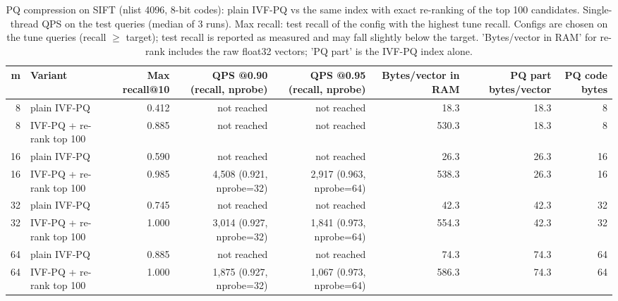 \begin{table}[t]
\centering
\small
\begin{adjustbox}{max width=\linewidth}
\begin{tabular}{rlrrrrrr}
\toprule
m & Variant & Max recall@10 & QPS @0.90 (recall, nprobe) & QPS @0.95 (recall, nprobe) & Bytes/vector in RAM & PQ part bytes/vector & PQ code bytes \\
\midrule
8 & plain IVF-PQ & 0.412 & not reached & not reached & 18.3 & 18.3 & 8 \\
8 & IVF-PQ + re-rank top 100 & 0.885 & not reached & not reached & 530.3 & 18.3 & 8 \\
16 & plain IVF-PQ & 0.590 & not reached & not reached & 26.3 & 26.3 & 16 \\
16 & IVF-PQ + re-rank top 100 & 0.985 & 4,508 (0.921, nprobe=32) & 2,917 (0.963, nprobe=64) & 538.3 & 26.3 & 16 \\
32 & plain IVF-PQ & 0.745 & not reached & not reached & 42.3 & 42.3 & 32 \\
32 & IVF-PQ + re-rank top 100 & 1.000 & 3,014 (0.927, nprobe=32) & 1,841 (0.973, nprobe=64) & 554.3 & 42.3 & 32 \\
64 & plain IVF-PQ & 0.885 & not reached & not reached & 74.3 & 74.3 & 64 \\
64 & IVF-PQ + re-rank top 100 & 1.000 & 1,875 (0.927, nprobe=32) & 1,067 (0.973, nprobe=64) & 586.3 & 74.3 & 64 \\
\bottomrule
\end{tabular}
\end{adjustbox}
\caption{PQ compression on SIFT (nlist 4096, 8-bit codes): plain IVF-PQ vs the same index with exact re-ranking of the top 100 candidates. Single-thread QPS on the test queries (median of 3 runs). Max recall: test recall of the config with the highest tune recall. Configs are chosen on the tune queries (recall $\geq$ target); test recall is reported as measured and may fall slightly below the target. 'Bytes/vector in RAM' for re-rank includes the raw float32 vectors; 'PQ part' is the IVF-PQ index alone.}
\label{tab:part3}
\end{table}
